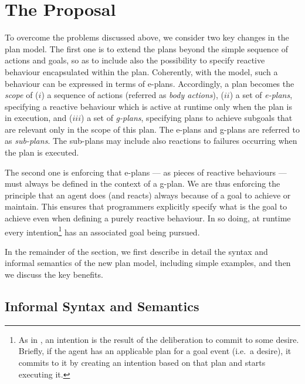 \section{The {\aser} Proposal}
\label{sec:proposal}


To overcome the problems discussed above, we consider two key changes
in the plan model.
%
The first one is to extend the plans beyond the simple sequence of
actions and goals, so as to include also the possibility to specify
reactive behaviour encapsulated within the plan.
%
Coherently, with the {\asl} model, such a behaviour can be expressed
in terms of e-plans.
%
Accordingly, a plan becomes the \emph{scope} of ($i$) a sequence of
actions (referred as \emph{body actions}), ($ii$) a set of
\emph{e-plans}, specifying a reactive behaviour which is active at
runtime only when the plan is in execution, and ($iii$) a set of
\emph{g-plans}, specifying plans to achieve subgoals that are relevant
only in the scope of this plan. The e-plans and g-plans are referred
to as \emph{sub-plans}.
%
The sub-plans may include also reactions to failures occurring when
the plan is executed.

%
%
%
The second one is enforcing that e-plans --- as pieces of reactive
behaviours --- must always be defined in the context of a g-plan. We
are thus enforcing the principle that an agent does (and reacts)
always because of a goal to achieve or maintain.
%
This ensures that programmers explicitly specify what is the goal to
achieve even when defining a purely reactive behaviour.
%
In so doing, at runtime every intention\footnote{As in \asl, an
  intention is the result of the deliberation to commit to some
  desire. Briefly, if the agent has an applicable plan for a goal
  event (i.e.\ a desire), it commits to it by creating an intention
  based on that plan and starts executing it.} has an
associated goal being pursued.
%

In the remainder of the section, we first describe in detail the
syntax and informal semantics of the new plan model, including simple
examples, and then we discuss the key benefits.

\subsection{Informal Syntax and Semantics}
\label{sec:infSS}

